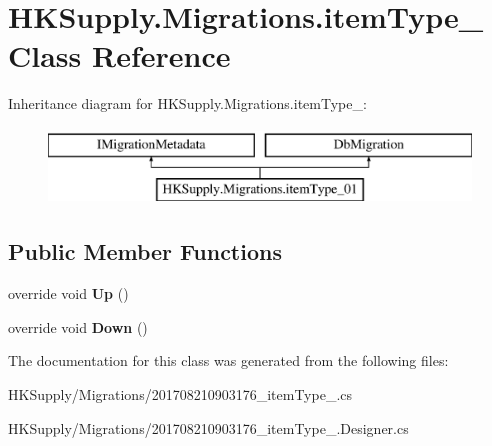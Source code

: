 \hypertarget{class_h_k_supply_1_1_migrations_1_1item_type__01}{}\section{H\+K\+Supply.\+Migrations.\+item\+Type\+\_ Class Reference}
\label{class_h_k_supply_1_1_migrations_1_1item_type__01}
Inheritance diagram for H\+K\+Supply.\+Migrations.\+item\+Type\+\_\+:\begin{figure}[H]
\begin{center}
\leavevmode
\includegraphics[height=2.000000cm]{class_h_k_supply_1_1_migrations_1_1item_type__01}
\end{center}
\end{figure}
\subsection*{Public Member Functions}
\begin{DoxyCompactItemize}
\item 
\mbox{\label{class_h_k_supply_1_1_migrations_1_1item_type__01_afdb879136c37df3c373d39e2b431dc69}} 
override void {\bfseries Up} ()
\item 
\mbox{\label{class_h_k_supply_1_1_migrations_1_1item_type__01_a7f5151ab42aee726b54a776e557e91b7}} 
override void {\bfseries Down} ()
\end{DoxyCompactItemize}


The documentation for this class was generated from the following files\+:\begin{DoxyCompactItemize}
\item 
H\+K\+Supply/\+Migrations/201708210903176\+\_\+item\+Type\+\_.\+cs\item 
H\+K\+Supply/\+Migrations/201708210903176\+\_\+item\+Type\+\_.\+Designer.\+cs\end{DoxyCompactItemize}

